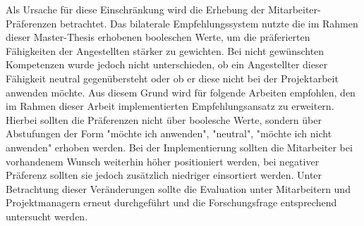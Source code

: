 Als Ursache für diese Einschränkung wird die Erhebung der Mitarbeiter-Präferenzen betrachtet. Das bilaterale Empfehlungssystem nutzte die im Rahmen dieser Master-Thesis erhobenen booleschen Werte, um die präferierten Fähigkeiten der Angestellten stärker zu gewichten. Bei nicht gewünschten Kompetenzen wurde jedoch nicht unterschieden, ob ein Angestellter dieser Fähigkeit neutral gegenübersteht oder ob er diese nicht bei der Projektarbeit anwenden möchte. Aus diesem Grund wird für folgende Arbeiten empfohlen, den im Rahmen dieser Arbeit implementierten Empfehlungsansatz zu erweitern. Hierbei sollten die Präferenzen nicht über boolesche Werte, sondern über Abstufungen der Form "möchte ich anwenden", "neutral", "möchte ich nicht anwenden" erhoben werden. Bei der Implementierung sollten die Mitarbeiter bei vorhandenem Wunsch weiterhin höher positioniert werden, bei negativer Präferenz sollten sie jedoch zusätzlich niedriger einsortiert werden. Unter Betrachtung dieser Veränderungen sollte die Evaluation unter Mitarbeitern und Projektmanagern erneut durchgeführt und die Forschungsfrage entsprechend untersucht werden.

\newpage

